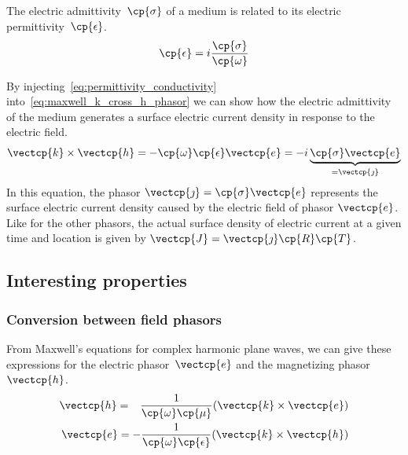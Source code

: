 The electric admittivity~$\cp{\sigma}$ of a medium is related to its electric permittivity~$\cp{\epsilon}$.
\begin{equation}
    \cp{\epsilon} = i \frac{\cp{\sigma}}{\cp{\omega}}
    \label{eq:permittivity_conductivity}
\end{equation}

By injecting~\cref{eq:permittivity_conductivity} into~\cref{eq:maxwell_k_cross_h_phasor}
we can show how the electric admittivity of the medium generates a surface electric current density in response to the electric field.
\begin{equation}
    \vectcp{k} \times \vectcp{h}
    =
    -\cp{\omega} \cp{\epsilon} \vectcp{e}
    =
    -i
    \underbrace{\cp{\sigma} \vectcp{e}}_{= \vectcp{\jmath}}
\end{equation}
In this equation, the phasor $\vectcp{\jmath} = \cp{\sigma} \vectcp{e}$ represents the surface electric current density caused by the electric field of phasor $\vectcp{e}$.
Like for the other phasors, the actual surface density of electric current at a given time and location is given by $\vectcp{J}=\vectcp{\jmath}\cp{R}\cp{T}$.


\subsection{Interesting properties}

\subsubsection{Conversion between field phasors}
From Maxwell's equations for complex harmonic plane waves, we can give these expressions for the electric phasor~$\vectcp{e}$ and the magnetizing phasor~$\vectcp{h}$.
\begin{subequations}
    \begin{align}
        \vectcp{h} =
        \hphantom{\mathrel{-}}\frac{1}{\cp{\omega}\cp{\mu}}(\vectcp{k} \times \vectcp{e})
        \label{eq:complex_h_k_e}
        \\
        \vectcp{e} = -\frac{1}{\cp{\omega}\cp{\epsilon}}(\vectcp{k} \times \vectcp{h})
        \label{eq:complex_e_k_h}
    \end{align}
\end{subequations}

